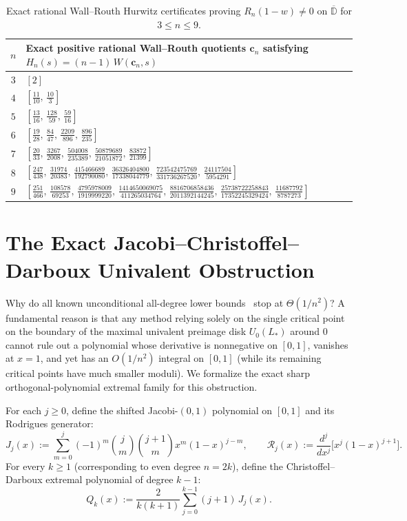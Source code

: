 \documentclass[11pt,a4paper]{article}
\theoremstyle{definition}
\theoremstyle{remark}
\newcommand{\DD}{\mathbb{D}}
\begin{document}
\begin{table}[h]
\centering
\scriptsize
\begin{tabular}{@{}cl@{}}
\toprule
$n$ & Exact positive rational Wall--Routh quotients $\mathbf{c}_n$ satisfying $H_n(s) = (n - 1)\, W(\mathbf{c}_n, s)$ \\
\midrule
$3$ & $[2]$ \\
$4$ & $[\frac{11}{10},\, \frac{10}{3}]$ \\
$5$ & $[\frac{13}{16},\, \frac{128}{59},\, \frac{59}{16}]$ \\
$6$ & $[\frac{19}{28},\, \frac{84}{47},\, \frac{2209}{896},\, \frac{896}{235}]$ \\
$7$ & $[\frac{20}{33},\, \frac{3267}{2008},\, \frac{504008}{235389},\, \frac{50879689}{21051872},\, \frac{83872}{21399}]$ \\
$8$ & $[\frac{247}{438},\, \frac{31974}{20383},\, \frac{415466689}{192790080},\, \frac{36326404800}{17338044779},\, \frac{723542475769}{331736267520},\, \frac{24117504}{5954291}]$ \\
$9$ & $[\frac{251}{466},\, \frac{108578}{69253},\, \frac{4795978009}{1919999220},\, \frac{1414650069075}{411265034764},\, \frac{8816706858436}{2011392144245},\, \frac{25738722258843}{17352245329424},\, \frac{11687792}{8787273}]$ \\
\bottomrule
\end{tabular}
\caption{Exact rational Wall--Routh Hurwitz certificates proving $R_n(1 - w) \neq 0$ on $\overline{\DD}$ for $3 \le n \le 9$.}
\label{tab:wall-routh}
\end{table}

\section{The Exact Jacobi--Christoffel--Darboux Univalent Obstruction}
\label{sec:jacobi}

Why do all known unconditional all-degree lower bounds~\cite{Dubinin2019,JatarNg2026} stop at $\Theta(1/n^2)$? A fundamental reason is that any method relying solely on the single critical point on the boundary of the maximal univalent preimage disk $U_0(L_*)$ around $0$ cannot rule out a polynomial whose derivative is nonnegative on $[0, 1]$, vanishes at $x = 1$, and yet has an $O(1/n^2)$ integral on $[0, 1]$ (while its remaining critical points have much smaller moduli). We formalize the exact sharp orthogonal-polynomial extremal family for this obstruction.

For each $j \ge 0$, define the shifted Jacobi-$(0, 1)$ polynomial on $[0, 1]$ and its Rodrigues generator:
\[
J_j(x) := \sum_{m=0}^j (-1)^m \binom{j}{m}\binom{j + 1}{m} x^m (1 - x)^{j - m}, \qquad
\mathcal{R}_j(x) := \frac{d^j}{dx^j}\bigl[x^j (1 - x)^{j + 1}\bigr].
\]
For every $k \ge 1$ (corresponding to even degree $n = 2k$), define the Christoffel--Darboux extremal polynomial of degree $k - 1$:
\[
Q_k(x) := \frac{2}{k(k + 1)} \sum_{j=0}^{k-1} (j + 1)\, J_j(x).
\]
\end{document}
